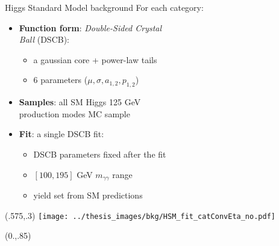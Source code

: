 \documentclass[10pt,UKenglish, leqno, xcolor = dvipsnames]{beamer}
\begin{document}
	\begin{frame}{Higgs Standard Model background}
		\vfill
		For each category:
		\begin{itemize}
			\item \textbf{Function form}: \textit{Double-Sided Crystal\\ Ball} (DSCB):
			\begin{itemize}
				\item a gaussian core + power-law tails
				\item 6 parameters ($\mu, \sigma, a_{1,2}, p_{1,2}$)
			\end{itemize}
			\item \textbf{Samples}: all SM Higgs 125 GeV\\ production modes MC sample
			\item \textbf{Fit}: a single DSCB fit:
			\begin{itemize}
				\item DSCB parameters fixed after the fit
				\item $[100,195]$ GeV $m_{\gamma\gamma}$ range
				\item yield set from SM predictions
			\end{itemize}
		\end{itemize}
		\vspace{.75cm}
		\vfill
		\begin{textblock}{1}(.575,.3)
			\texttt{[image: ../thesis\_images/bkg/HSM\_fit\_catConvEta\_no.pdf]}\\	
		\end{textblock}
		\begin{textblock}{1}(0.,.85)
			\begin{figure}
			\end{figure}
		\end{textblock}
	\end{frame}
\end{document}
